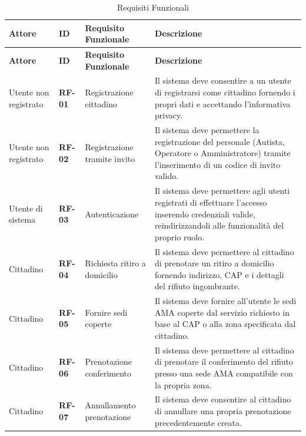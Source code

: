 \begin{center}
\renewcommand{\arraystretch}{1.3}
\begin{longtable}{|p{2.8cm}|p{1.2cm}|p{3.8cm}|p{6.2cm}|}
\caption{Requisiti Funzionali}\label{tab:rf} \\ \hline
\rowcolor{tableheader} \textbf{Attore} & \textbf{ID} & \textbf{Requisito Funzionale} & \textbf{Descrizione} \\ \hline
\endfirsthead

\hline
\rowcolor{tableheader} \textbf{Attore} & \textbf{ID} & \textbf{Requisito Funzionale} & \textbf{Descrizione} \\ \hline
\endhead

Utente non registrato & \textbf{RF-01} & Registrazione cittadino & Il sistema deve consentire a un utente di registrarsi come cittadino fornendo i propri dati e accettando l'informativa privacy. \\ \hline

Utente non registrato & \textbf{RF-02} & Registrazione tramite invito & Il sistema deve permettere la registrazione del personale (Autista, Operatore o Amministratore) tramite l'inserimento di un codice di invito valido. \\ \hline

Utente di sistema & \textbf{RF-03} & Autenticazione & Il sistema deve permettere agli utenti registrati di effettuare l'accesso inserendo credenziali valide, reindirizzandoli alle funzionalità del proprio ruolo. \\ \hline

Cittadino & \textbf{RF-04} & Richiesta ritiro a domicilio & Il sistema deve permettere al cittadino di prenotare un ritiro a domicilio fornendo indirizzo, CAP e i dettagli del rifiuto ingombrante. \\ \hline

Cittadino & \textbf{RF-05} & Fornire sedi coperte & Il sistema deve fornire all'utente le sedi AMA coperte dal servizio richiesto in base al CAP o alla zona specificata dal cittadino. \\ \hline

Cittadino & \textbf{RF-06} & Prenotazione conferimento & Il sistema deve permettere al cittadino di prenotare il conferimento del rifiuto presso una sede AMA compatibile con la propria zona. \\ \hline

Cittadino & \textbf{RF-07} & Annullamento prenotazione & Il sistema deve consentire al cittadino di annullare una propria prenotazione precedentemente creata. \\ \hline


\end{longtable}
\end{center}
